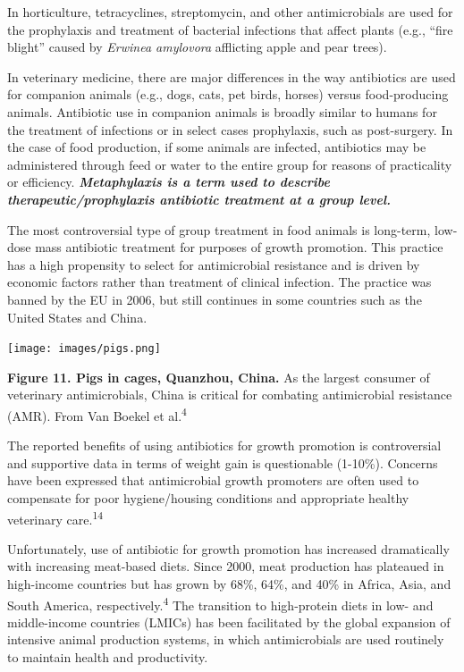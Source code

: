 \documentclass[
  11pt,
  paper=a4,
  ,captions=tableheading
]{scrartcl}
\begin{document}
In horticulture, tetracyclines, streptomycin, and other antimicrobials
are used for the prophylaxis and treatment of bacterial infections that
affect plants (e.g., ``fire blight'' caused by \emph{Erwinea amylovora}
afflicting apple and pear trees).

In veterinary medicine, there are major differences in the way
antibiotics are used for companion animals (e.g., dogs, cats, pet birds,
horses) versus food-producing animals. Antibiotic use in companion
animals is broadly similar to humans for the treatment of infections or
in select cases prophylaxis, such as post-surgery. In the case of food
production, if some animals are infected, antibiotics may be
administered through feed or water to the entire group for reasons of
practicality or efficiency. \textbf{\emph{Metaphylaxis is a term used to
describe therapeutic/prophylaxis antibiotic treatment at a group
level.}}

The most controversial type of group treatment in food animals is
long-term, low-dose mass antibiotic treatment for purposes of growth
promotion. This practice has a high propensity to select for
antimicrobial resistance and is driven by economic factors rather than
treatment of clinical infection. The practice was banned by the EU in
2006, but still continues in some countries such as the United States
and China.

\texttt{[image: images/pigs.png]}

\textbf{Figure 11. Pigs in cages, Quanzhou, China.} As the largest
consumer of veterinary antimicrobials, China is critical for combating
antimicrobial resistance (AMR). From Van Boekel et
al.\textsuperscript{4}

The reported benefits of using antibiotics for growth promotion is
controversial and supportive data in terms of weight gain is
questionable (1-10\%). Concerns have been expressed that antimicrobial
growth promoters are often used to compensate for poor hygiene/housing
conditions and appropriate healthy veterinary care.\textsuperscript{14}

Unfortunately, use of antibiotic for growth promotion has increased
dramatically with increasing meat-based diets. Since 2000, meat
production has plateaued in high-income countries but has grown by 68\%,
64\%, and 40\% in Africa, Asia, and South America,
respectively.\textsuperscript{4} The transition to high-protein diets in
low- and middle-income countries (LMICs) has been facilitated by the
global expansion of intensive animal production systems, in which
antimicrobials are used routinely to maintain health and productivity.
\end{document}
